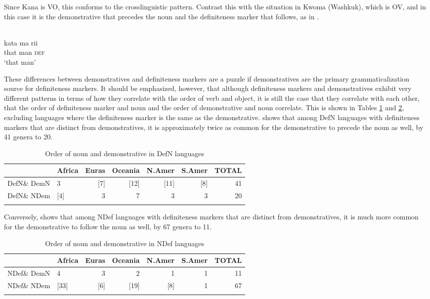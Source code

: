 \documentclass[output=paper]{langsci/langscibook}
\begin{document}
Since Kana is VO, this conforms to the crosslinguistic pattern. Contrast this with the situation in Kwoma (Washkuk), which is OV, and in this case it is the demonstrative that precedes the noun and the definiteness marker that follows, as in .

\ea\label{ex:dryer:42}
\\
\gll   kata  ma  rii\\
       that  man  \textsc{def}\\
\glt   ‘that man’
\z

These differences between demonstratives and definiteness markers are a puzzle if demonstratives are the primary grammaticalization source for definiteness markers. It should be emphasized, however, that although definiteness markers and demonstratives exhibit very different patterns in terms of how they correlate with the order of verb and object, it is still the case that they correlate with each other, that the order of definiteness marker and noun and the order of demonstrative and noun correlate. This is shown in Tables \ref{tab:dryer:14} and \ref{tab:dryer:15}, excluding languages where the definiteness marker is the same as the demonstrative.  shows that among DefN languages with definiteness markers that are distinct from demonstratives, it is approximately twice as common for the demonstrative to precede the noun as well, by 41 genera to 20.

\begin{table}
\begin{tabularx}{\textwidth}{Xlrrrrr}
\lsptoprule
& \bfseries Africa & \bfseries Euras & \bfseries Oceania & \bfseries N.Amer & \bfseries S.Amer & \bfseries TOTAL\\
\midrule
DefN\& DemN & 3 & [7] & [12] & [11] & [8] & 41\\
DefN\& NDem & [4] & 3 & 7 & 3 & 3 & 20\\
\lspbottomrule
\end{tabularx}
\caption{\label{tab:dryer:14}Order of noun and demonstrative in DefN languages}
\end{table}

Conversely,  shows that among NDef languages with definiteness markers that are distinct from demonstratives, it is much more common for the demonstrative to follow the noun as well, by 67 genera to 11.

\begin{table}
\begin{tabularx}{\textwidth}{Xlrrrrr}
\lsptoprule
& \bfseries Africa & \bfseries Euras & \bfseries Oceania & \bfseries N.Amer & \bfseries S.Amer & \bfseries TOTAL\\
\midrule
NDef\& DemN & 4 & 3 & 2 & 1 & 1 & 11\\
NDef\& NDem & [33] & [6] & [19] & [8] & 1 & 67\\
\lspbottomrule
\end{tabularx}
\caption{\label{tab:dryer:15}Order of noun and demonstrative in NDef languages}
\end{table}
\end{document}
